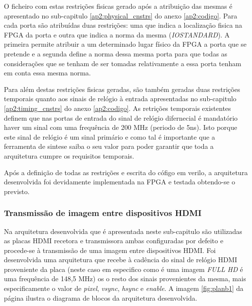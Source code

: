 O ficheiro com estas restrições fisicas gerado após a atribuição das mesmas é apresentado no sub-capitulo \ref{ap2:physical_cnstrs} do anexo \ref{ap2:codigo}. Para cada porta são atribuídas duas restrições: uma que indica a localização fisica na FPGA da porta e outra que indica a norma da mesma (\textit{IOSTANDARD}). A primeira permite atribuir a um determinado lugar físico da FPGA a porta que se pretende e a segunda define a norma dessa mesma porta para que todas as considerações que se tenham de ser tomadas relativamente a essa porta tenham em conta essa mesma norma.

Para além destas restrições fisicas geradas, são também geradas duas restrições temporais quanto aos sinais de relógio à entrada apresentadas no sub-capitulo \ref{ap2:timing_cnstrs} do anexo \ref{ap2:codigo}. As retrições temporais existentes definem que nas portas de entrada do sinal de relógio difernecial é mandatório haver um sinal com uma frequência de 200 MHz (periodo de 5ns). Isto porque este sinal de relógio é um sinal primário e como tal é importante que a ferramenta de sintese saiba o seu valor para poder garantir que toda a arquitetura cumpre os requisitos temporais.

Após a definição de todas as restrições e escrita do cófigo em verilo, a arquitetura desenvolvida foi devidamente implementada na FPGA e testada obtendo-se o previsto.
\subsubsection{Transmissão de imagem entre dispositivos HDMI} \label{subsub:planB}

Na arquitetura desenvolvida que é apresentada neste sub-capitulo são utilizadas as placas HDMI recetora e transmissora ambas configuradas por defeito e procede-se à transmissão de uma imagem entre dispositivos HDMI. Foi desenvolvida uma arquitetura que recebe à cadência do sinal de relógio HDMI proveniente da placa (neste caso em especifico como é uma imagem \textit{FULL HD} é uma frequência de 148,5 MHz) os o resto dos sinais provenientes da mesma, mais especificamente o valor de \textit{pixel}, \textit{vsync}, \textit{hsync} e \textit{enable}. A imagem \ref{fig:planb1} da página \pageref{fig:planb1} ilustra o diagrama de blocos da arquitetura desenvolvida.

